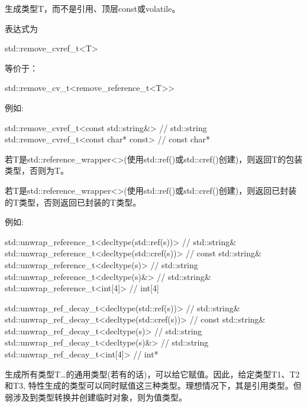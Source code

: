 



生成类型T，而不是引用、顶层const或volatile。

表达式为

\begin{cpp}
std::remove_cvref_t<T>
\end{cpp}

等价于：

\begin{cpp}
std::remove_cv_t<remove_reference_t<T>>
\end{cpp}

例如:

\begin{cpp}
std::remove_cvref_t<const std::string&> // std::string
std::remove_cvref_t<const char* const> // const char*
\end{cpp}



若T是std::reference\_wrapper<>(使用std::ref()或std::cref()创建)，则返回T的包装类型，否则为T。


若T是std::reference\_wrapper<>(使用std::ref()或std::cref()创建)，则返回已封装的T类型，否则返回已封装的T类型。

例如:

\begin{cpp}
std::unwrap_reference_t<decltype(std::ref(s))> // std::string&
std::unwrap_reference_t<decltype(std::cref(s))> // const std::string&
std::unwrap_reference_t<decltype(s)> // std::string
std::unwrap_reference_t<decltype(s)&> // std::string&
std::unwrap_reference_t<int[4]> // int[4]

std::unwrap_ref_decay_t<decltype(std::ref(s))> // std::string&
std::unwrap_ref_decay_t<decltype(std::cref(s))> // const std::string&
std::unwrap_ref_decay_t<decltype(s)> // std::string
std::unwrap_ref_decay_t<decltype(s)&> // std::string
std::unwrap_ref_decay_t<int[4]> // int*
\end{cpp}




生成所有类型T…的通用类型(若有的话)，可以给它赋值。因此，给定类型T1、T2和T3, 特性生成的类型可以同时赋值这三种类型。理想情况下，其是引用类型。但弱涉及到类型转换并创建临时对象，则为值类型。

